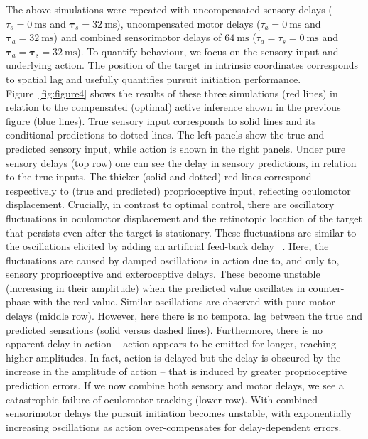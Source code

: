 \documentclass[a4paper]{article} %
\newcommand{\ms}{\si{\milli\second}}%
\begin{document}
The above simulations were repeated with uncompensated sensory delays ($\tau_s =0~\ms$ and $\bm{\tau}_s=32~\ms$), uncompensated motor delays ($\tau_a =0~\ms$ and $\bm{\tau}_a=32~\ms$) and combined sensorimotor delays of $64~\ms$
($\tau_a =\tau_s =0~\ms$ and $\bm{\tau}_a=\bm{\tau}_s=32~\ms$).
To quantify behaviour, we focus on the sensory input and underlying
action. The position of the target in intrinsic coordinates corresponds
to spatial lag and usefully quantifies pursuit initiation performance.
Figure~\ref{fig:figure4} shows the results of these three simulations (red lines) in
relation to the compensated (optimal) active inference shown in the
previous figure (blue lines). True sensory input corresponds to solid
lines and its conditional predictions to dotted lines. The left panels
show the true and predicted sensory input, while action is shown in the
right panels. Under pure sensory delays (top row) one can see the delay
in sensory predictions, in relation to the true inputs. The thicker
(solid and dotted) red lines correspond respectively to (true and
predicted) proprioceptive input, reflecting oculomotor displacement.
Crucially, in contrast to optimal control, there are oscillatory fluctuations in oculomotor displacement and the retinotopic location of the target that persists even after the target is stationary. These fluctuations are similar to the oscillations elicited by adding an artificial feed-back delay ~\citep{Goldreich92}. Here, the fluctuations are caused by damped oscillations in action due to, and only to, sensory proprioceptive and exteroceptive delays. These become unstable (increasing in their amplitude) when the predicted value oscillates in counter-phase with the real value. %
Similar
oscillations are observed with pure motor delays (middle row). However,
here there is no temporal lag between the true and predicted sensations
(solid versus dashed lines). Furthermore, there is no apparent delay in
action -- action appears to be emitted for longer, reaching higher
amplitudes. In fact, action is delayed but the delay is obscured by the
increase in the amplitude of action -- that is induced by greater
proprioceptive prediction errors. If we now combine both sensory and
motor delays, we see a catastrophic failure of oculomotor tracking
(lower row). With combined sensorimotor delays the pursuit initiation
becomes unstable, with exponentially increasing oscillations as action
over-compensates for delay-dependent errors.
\end{document}
